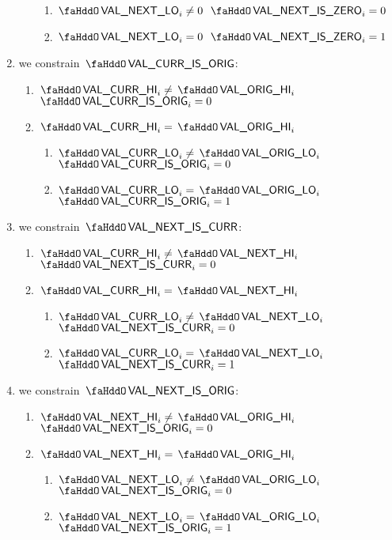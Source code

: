 \begin{enumerate}
\begin{enumerate}
		\begin{enumerate}
			\item \If $\stoNextValueLo_{i} \neq	0$ \Then $\stoNextValueIsZero_{i} = 0$
			\item \If $\stoNextValueLo_{i}	=	0$ \Then $\stoNextValueIsZero_{i} = 1$
		\end{enumerate}
	\end{enumerate}
	\item we constrain $\stoCurrValueIsOrig$:
	\begin{enumerate}
		\item \If $\stoCurrValueHi_{i} \neq \stoOrigValueHi_{i}$ \Then $\stoCurrValueIsOrig_{i} = 0$
		\item \If $\stoCurrValueHi_{i} 	= \stoOrigValueHi_{i}$ \Then
		\begin{enumerate}
			\item \If $\stoCurrValueLo_{i} \neq	\stoOrigValueLo_{i}$ \Then $\stoCurrValueIsOrig_{i} = 0$
			\item \If $\stoCurrValueLo_{i}	=	\stoOrigValueLo_{i}$ \Then $\stoCurrValueIsOrig_{i} = 1$
		\end{enumerate}
	\end{enumerate}
	\item we constrain $\stoNextValueIsCurr$:
	\begin{enumerate}
		\item \If $\stoCurrValueHi_{i} \neq \stoNextValueHi_{i}$ \Then $\stoNextValueIsCurr_{i} = 0$
		\item \If $\stoCurrValueHi_{i} 	= \stoNextValueHi_{i}$ \Then
		\begin{enumerate}
			\item \If $\stoCurrValueLo_{i} \neq	\stoNextValueLo_{i}$ \Then $\stoNextValueIsCurr_{i} = 0$
			\item \If $\stoCurrValueLo_{i}	=	\stoNextValueLo_{i}$ \Then $\stoNextValueIsCurr_{i} = 1$
		\end{enumerate}
	\end{enumerate}
	\item we constrain $\stoNextValueIsOrig$:
	\begin{enumerate}
		\item \If $\stoNextValueHi_{i} \neq	\stoOrigValueHi_{i}$ \Then $\stoNextValueIsOrig_{i} = 0$
		\item \If $\stoNextValueHi_{i} =		\stoOrigValueHi_{i}$ \Then
		\begin{enumerate}
			\item \If $\stoNextValueLo_{i} \neq	\stoOrigValueLo_{i}$ \Then $\stoNextValueIsOrig_{i} = 0$
			\item \If $\stoNextValueLo_{i}	=	\stoOrigValueLo_{i}$ \Then $\stoNextValueIsOrig_{i} = 1$
		\end{enumerate}
	\end{enumerate}
\end{enumerate}
